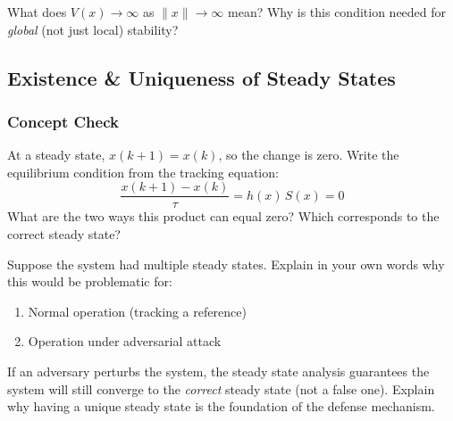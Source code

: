 \begin{answerbox}\end{answerbox}

What does $V(x) \to \infty$ as $\|x\| \to \infty$ mean? Why is this condition needed for \emph{global} (not just local) stability?

\begin{answerbox}\end{answerbox}

\subsection{Existence \& Uniqueness of Steady States}

\subsubsection*{Concept Check}

At a steady state, $x(k+1) = x(k)$, so the change is zero. Write the equilibrium condition from the tracking equation:
\[
  \frac{x(k+1) - x(k)}{\tau} = h(x)\,S(x) = 0
\]
What are the two ways this product can equal zero? Which corresponds to the correct steady state?

\begin{answerbox}\end{answerbox}

Suppose the system had multiple steady states. Explain in your own words why this would be problematic for:
\begin{enumerate}[nosep, label=(\alph*)]
  \item Normal operation (tracking a reference)
  \item Operation under adversarial attack
\end{enumerate}

\begin{answerbox}\end{answerbox}

If an adversary perturbs the system, the steady state analysis guarantees the system will still converge to the \emph{correct} steady state (not a false one). Explain why having a unique steady state is the foundation of the defense mechanism.

\begin{answerbox}\end{answerbox}

